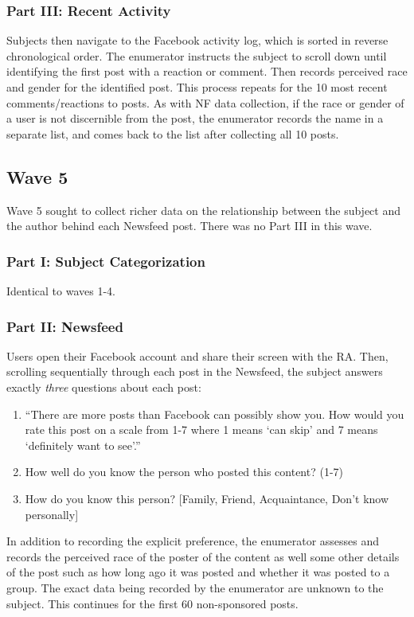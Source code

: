 \documentclass[12pt,letterpaper]{article}
\begin{document}
\subsubsection{Part III: Recent Activity} Subjects then navigate to the Facebook activity log, which is sorted in reverse chronological order. The enumerator instructs the subject to scroll down until identifying the first post with a reaction or comment. Then records perceived race and gender for the identified post. This process repeats for the 10 most recent comments/reactions to posts. As with NF data collection, if the race or gender of a user is not discernible from the post, the enumerator records the name in a separate list, and comes back to the list after collecting all 10 posts.

\subsection{Wave 5}

Wave 5 sought to collect richer data on the relationship between the subject and the author behind each Newsfeed post. There was no Part III in this wave.

\subsubsection{Part I: Subject Categorization} Identical to waves 1-4.

\subsubsection{Part II: Newsfeed} Users open their Facebook account and share their screen with the RA. Then, scrolling sequentially through each post in the Newsfeed, the subject answers exactly \textit{three} questions about each post: 
\begin{enumerate}
    \item “There are more posts than Facebook can possibly show you. How would you rate this post on a scale from 1-7 where 1 means ‘can skip’ and 7 means ‘definitely want to see’.” 
    \item How well do you know the person who posted this content? (1-7)
    \item How do you know this person? [Family, Friend, Acquaintance, Don’t know personally]
\end{enumerate}

In addition to recording the explicit preference, the enumerator assesses and records the perceived race of the poster of the content as well some other details of the post such as how long ago it was posted and whether it was posted to a group. The exact data being recorded by the enumerator are unknown to the subject. This continues for the first 60 non-sponsored posts.
\end{document}
